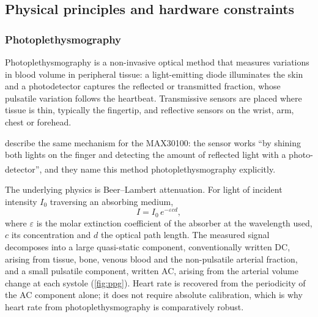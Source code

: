 \documentclass[12pt,a4paper,oneside]{report}
\newcommand{\bq}[1]{``#1''\textsuperscript{\dag}}
\begin{document}
\subsection{Physical principles and hardware constraints}\label{sec:hardware}

\subsubsection{Photoplethysmography}\label{sec:ppg}

Photoplethysmography is a non-invasive optical method that measures variations in blood volume in peripheral tissue: a light-emitting diode illuminates the skin and a photodetector captures the reflected or transmitted fraction, whose pulsatile variation follows the heartbeat. Transmissive sensors are placed where tissue is thin, typically the fingertip, and reflective sensors on the wrist, arm, chest or forehead.

\Textcite{efendi2025} describe the same mechanism for the MAX30100: the sensor works \bq{by shining both lights on the finger and detecting the amount of reflected light with a photo-detector}, and they name this method photoplethysmography explicitly.

The underlying physics is Beer--Lambert attenuation. For light of incident intensity $I_0$ traversing an absorbing medium,
\begin{equation}
  I = I_0 \, e^{-\varepsilon c d},
\end{equation}
where $\varepsilon$ is the molar extinction coefficient of the absorber at the wavelength used, $c$ its concentration and $d$ the optical path length. The measured signal decomposes into a large quasi-static component, conventionally written DC, arising from tissue, bone, venous blood and the non-pulsatile arterial fraction, and a small pulsatile component, written AC, arising from the arterial volume change at each systole (\cref{fig:ppg}). Heart rate is recovered from the periodicity of the AC component alone; it does not require absolute calibration, which is why heart rate from photoplethysmography is comparatively robust.
\end{document}
